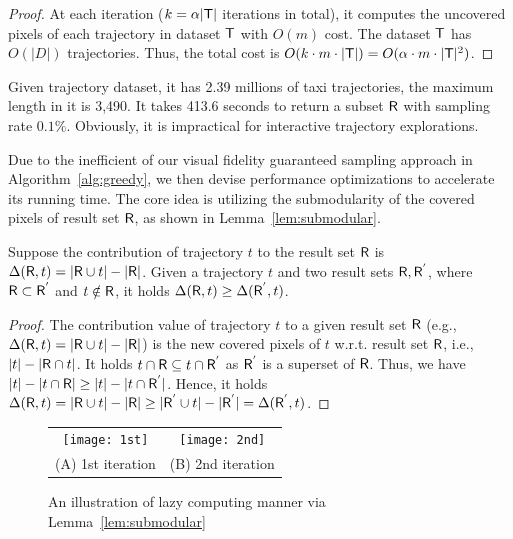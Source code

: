 \begin{proof}
At each iteration ($k = \alpha |\mathsf{T}|$ iterations in total),
it computes the uncovered pixels of each trajectory in dataset $\mathsf{T}$ with $O(m)$ cost.
The dataset $\mathsf{T}$ has $O(|D|)$ trajectories.
Thus, the total cost is $O(k \cdot m \cdot |\mathsf{T}|)=O(\alpha \cdot m \cdot |\mathsf{T}|^2)$.
\end{proof}

 Given \pt{} trajectory dataset, it has 2.39 millions of taxi trajectories, the maximum length in it is 3,490.
It takes 413.6 seconds to return a subset $\mathsf{R}$ with sampling rate $0.1\%$.
Obviously, it is impractical for interactive trajectory explorations.

Due to the inefficient of our visual fidelity guaranteed sampling approach in Algorithm~\ref{alg:greedy},
we then devise performance optimizations to accelerate its running time.
The core idea is utilizing the submodularity of the covered pixels of result set $\mathsf{R}$, as shown in Lemma~\ref{lem:submodular}.

\begin{lemma}[Submodularity]\label{lem:submodular}
Suppose the contribution of trajectory $t$ to the result set $\mathsf{R}$ is $\Delta(\mathsf{R}, t) = |\mathsf{R} \cup t| - |\mathsf{R}|$.
Given a trajectory $t$ and two result sets $\mathsf{R},\mathsf{R}^{'}$, where $\mathsf{R} \subset \mathsf{R}^{'}$ and $t \notin \mathsf{R}$,
it holds $ \Delta(\mathsf{R}, t) \geq \Delta(\mathsf{R}^{'}, t)$.
\end{lemma}

\begin{proof}
The contribution value of trajectory $t$ to a given result set $\mathsf{R}$ (e.g., $\Delta(\mathsf{R}, t) = |\mathsf{R} \cup t| - |\mathsf{R}|$) is the new covered pixels of $t$ w.r.t. result set $\mathsf{R}$, i.e., $|t| - |\mathsf{R} \cap t|$.
It holds $t \cap \mathsf{R} \subseteq  t \cap \mathsf{R}^{'}$ as $\mathsf{R}^{'}$ is a superset of $\mathsf{R}$.
Thus, we have $|t| - |t \cap \mathsf{R}| \geq |t| - |t \cap \mathsf{R}^{'}|$.
Hence, it holds $\Delta(\mathsf{R}, t) = |\mathsf{R} \cup t| - |\mathsf{R}| \geq |\mathsf{R}^{'} \cup t| - |\mathsf{R}^{'}|= \Delta(\mathsf{R}^{'}, t)$.
\end{proof}

\begin{figure}
 \centering
 \small
 \begin{tabular}{cc}
   \texttt{[image: 1st]}
   &
   \texttt{[image: 2nd]}
   \\
   (A) 1st iteration
   &
   (B) 2nd iteration
 \end{tabular}
 \caption{An illustration of lazy computing manner via Lemma~\ref{lem:submodular}} \label{fig:heap}
 \vspace{-4mm}
\end{figure}


